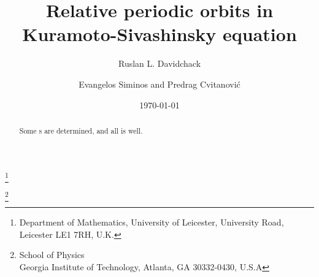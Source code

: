 \documentclass{siamltex}
\begin{document}
                \title{
Relative periodic orbits in Kuramoto-Sivashinsky equation
                 }
                  \author{
Ruslan L. Davidchack
                          }
                  \thanks{
Department of Mathematics, University of Leicester,
            University Road, Leicester LE1 7RH, U.K.
                }

                  \author{
Evangelos Siminos
    and
Predrag Cvitanovi\'c
                          }
                  \thanks{
          School of Physics\\
          Georgia Institute of Technology, Atlanta, GA 30332-0430, U.S.A}

                  \date{\today} %
  
                \begin{abstract}
% 
Some \nameit s are determined, and all is well. 
        \end{abstract}

                     \maketitle








    \PublicPrivate{%
        }{%

    } %



        \Preliminary{

            } %



\end{document}
